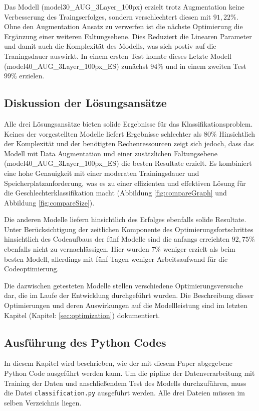 \documentclass[journal,twoside,web]{ieeecolor}
\begin{document}
Das Modell (model30\_AUG\_3Layer\_100px) erzielt trotz Augmentation keine Verbesserung des Traingserfolges, sondern verschlechtert diesen mit $91,22\%$. 
Ohne den Augmentation Ansatz zu verwerfen ist die nächste Optimierung die Ergänzung einer weiteren Faltungsebene. 
Dies Reduziert die Linearen Parameter und damit auch die Komplexität des Modells, was sich postiv auf die Traningsdauer auswirkt. 
In einem ersten Test konnte dieses Letzte Modell (model40\_AUG\_3Layer\_100px\_ES) zunächst $94\%$ und in einem zweiten Test $99\%$ erzielen.

\subsection{Diskussion der Lösungsansätze}
Alle drei Lösungsansätze bieten solide Ergebnisse für das Klassifikationsproblem. Keines der vorgestellten Modelle liefert Ergebnisse schlechter als $80\%$ Hinsichtlich der Komplexität und der benötigten Rechenressourcen zeigt sich jedoch, dass das Modell mit Data Augmentation und einer zusätzlichen Faltungsebene (model40\_AUG\_3Layer\_100px\_ES) die besten Resultate erzielt. Es kombiniert eine hohe Genauigkeit mit einer moderaten Trainingsdauer und Speicherplatzanforderung, was es zu einer effizienten und effektiven Lösung für die Geschlechterklassifikation macht (Abbildung \ref{fig:compareGraph} und Abbildung \ref{fig:compareSize}).

Die anderen Modelle liefern hinsichtlich des Erfolges ebenfalls solide Resultate. 
Unter Berücksichtigung der zeitlichen Komponente des Optimierungsfortschrittes hinsichtlich des Codeaufbaus der fünf Modelle sind die anfangs erreichten $92,75\%$ ebenfalls nicht zu vernachlässigen. Hier wurden $7\%$ weniger erzielt als beim besten Modell, allerdings mit fünf Tagen weniger Arbeitsaufwand für die Codeoptimierung. 

Die dazwischen getesteten Modelle stellen verschiedene Optimierungsversuche dar, die im Laufe der Entwicklung durchgeführt wurden. Die Beschreibung dieser Optimierungen und deren Auswirkungen auf die Modellleistung sind im letzten Kapitel (Kapitel: \ref{sec:optimization}) dokumentiert.

\subsection{Ausführung des Python Codes}

In diesem Kapitel wird beschrieben, wie der mit diesem Paper abgegebene Python Code ausgeführt werden kann.
Um die pipline der Datenverarbeitung mit Training der Daten und anschließendem Test des Modells durchzuführen, muss die Datei \texttt{classification.py} ausgeführt werden. Alle drei Dateien müssen im selben Verzeichnis liegen.
\end{document}

